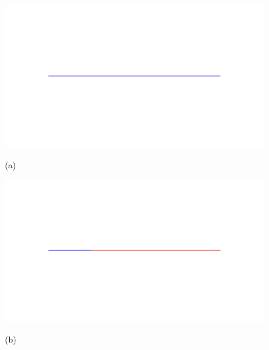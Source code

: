 

\begin{figure} [ht]
   \centering
   \begin{makeimage}
   \end{makeimage}
   \begin{latexonly}
	\hspace{0.1cm}
	\begin{minipage} [c] [] [c]{3.5cm} 
	\includegraphics [width =\textwidth] {images/WireStentDemot2Step01}
	\begin{center}
	\vspace{-3ex}
	(a)
	\vspace{1ex}
	\end{center}
\end{minipage}
\hspace{0.3cm}
\begin{minipage} [c] [] [c] {3.5cm}
	\includegraphics [width =\textwidth] {images/WireStentDemot2Step02}
	\begin{center}
	\vspace{-3ex}
	(b)
	\vspace{1ex}
	\end{center}

\end{minipage}
\end{latexonly}
\end{figure}
